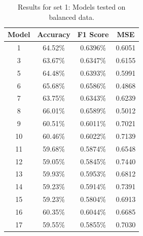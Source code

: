 \begin{table}[H]
	\begin{tabular}{|c|c|c|c|}
		\hline
		\textbf{Model} & \textbf{Accuracy} & \textbf{F1 Score} & \textbf{MSE} \\ \hline
		1              & 64.52\%             &  0.6396\%        &  0.6051   \\
		3              & 63.67\%             &  0.6347\%        &  0.6155   \\
		5              & 64.48\%             &  0.6393\%        &  0.5991   \\
		6              & 65.68\%             &  0.6586\%        &  0.4868   \\
		7              & 63.75\%             &  0.6343\%        &  0.6239   \\
		8              & 66.01\%             &  0.6589\%        &  0.5012   \\
		9              & 60.51\%             &  0.6011\%        &  0.7021   \\
		10             & 60.46\%             &  0.6022\%        &  0.7139   \\
		11             & 59.68\%             &  0.5874\%        &  0.6548   \\
		12             & 59.05\%             &  0.5845\%        &  0.7440   \\	
		13             & 59.93\%             &  0.5953\%        &  0.6812   \\	
		14             & 59.23\%             &  0.5914\%        &  0.7391   \\	
		15             & 59.23\%             &  0.5804\%        &  0.6913   \\	
		16             & 60.35\%             &  0.6044\%        &  0.6685   \\	
		17             & 59.55\%             &  0.5855\%        &  0.7030   \\ \hline	
	\end{tabular}
	\caption{\label{tab:resset1_exp}Results for set 1: Models tested on balanced data.}
\end{table}

